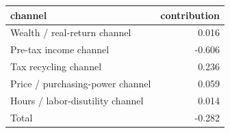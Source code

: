 \begin{tabular}{lr}
\toprule
channel & contribution \\
\midrule
Wealth / real-return channel & 0.016 \\
Pre-tax income channel & -0.606 \\
Tax recycling channel & 0.236 \\
Price / purchasing-power channel & 0.059 \\
Hours / labor-disutility channel & 0.014 \\
Total & -0.282 \\
\bottomrule
\end{tabular}
